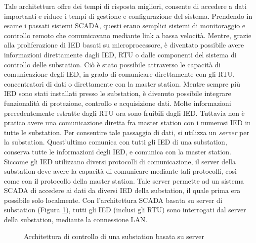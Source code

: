 Tale architettura offre dei tempi di risposta migliori, consente di accedere a dati importanti e riduce i tempi di gestione e configurazione del sistema. Prendendo in esame i passati sistemi SCADA, questi erano semplici sistemi di monitoraggio e controllo remoto che comunicavano mediante link a bassa velocità. Mentre, grazie alla proliferazione di IED basati su microprocessore, è diventato possibile avere informazioni direttamente dagli IED, RTU o dalle componenti del sistema di controllo delle substation. Ciò è stato possibile attraverso le capacità di comunicazione degli IED, in grado di comunicare direttamente con gli RTU, concentratori di dati o direttamente con la master station. Mentre sempre più IED sono stati installati presso le substation, è divenuto possibile integrare funzionalità di protezione, controllo e acquisizione dati. Molte informazioni precedentemente estratte dagli RTU ora sono fruibili dagli IED. Tuttavia non è pratico avere una comunicazione diretta fra master station con i numerosi IED in tutte le substation. Per consentire tale passaggio di dati, si utilizza un \emph{server} per la substation. Quest'ultimo comunica con tutti gli IED di una substation, conserva tutte le informazioni degli IED, e comunica con la master station. Siccome gli IED utilizzano diversi protocolli di comunicazione, il server della substation deve avere la capacità di comunicare mediante tali protocolli, così come con il protocollo della master station. Tale server permette ad un sistema SCADA di accedere ai dati da diversi IED della substation, il quale prima era possibile solo localmente. Con l'architettura SCADA basata su server di substation (Figura \ref{fig:27}), tutti gli IED (inclusi gli RTU) sono interrogati dal server della substation, mediante la connessione LAN. 
\begin{figure}[h] 
\caption{Architettura di controllo di una substation basata su server}\label{fig:27}
\end{figure}
